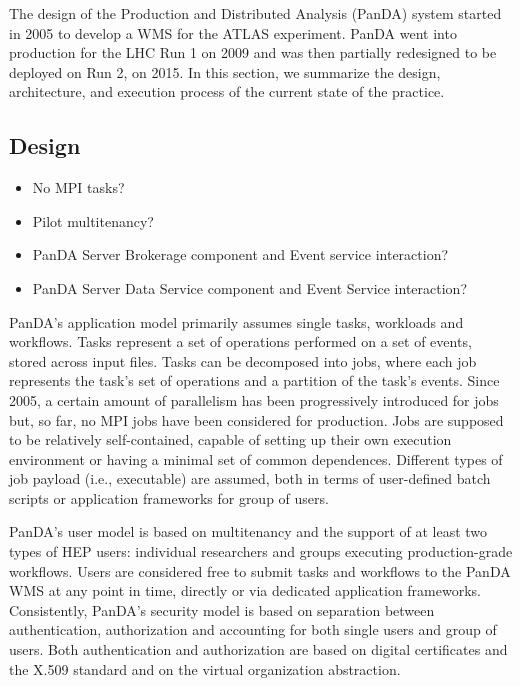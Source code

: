 
The design of the Production and Distributed Analysis (PanDA) system started in
2005 to develop a WMS for the ATLAS experiment. PanDA went into production for
the LHC Run 1 on 2009 and was then partially redesigned to be deployed on Run 2,
on 2015. In this section, we summarize the design, architecture, and execution
process of the current state of the practice.


\subsection{Design}
\label{ssec:panda_design}

\begin{itemize}
  \item No MPI tasks?
  \item Pilot multitenancy?
  \item PanDA Server Brokerage component and Event service interaction?
  \item PanDA Server Data Service component and Event Service interaction?
\end{itemize}

PanDA's application model primarily assumes single tasks, workloads and
workflows. Tasks represent a set of operations performed on a set of events,
stored across input files. Tasks can be decomposed into jobs, where each job
represents the task's set of operations and a partition of the task's events.
Since 2005, a certain amount of parallelism has been progressively introduced
for jobs~\cite{multithreaded_jobs} but, so far, no MPI jobs have been considered
for production. Jobs are supposed to be relatively self-contained, capable of
setting up their own execution environment or having a minimal set of common
dependences. Different types of job payload (i.e., executable) are assumed, both
in terms of user-defined batch scripts or application frameworks for group of
users.

PanDA's user model is based on multitenancy and the support of at least two
types of HEP users: individual researchers and groups executing production-grade
workflows. Users are considered free to submit tasks and workflows to the PanDA
WMS at any point in time, directly or via dedicated application frameworks.
Consistently, PanDA's security model is based on separation between
authentication, authorization and accounting for both single users and group of
users. Both authentication and authorization are based on digital certificates
and the X.509 standard and on the virtual organization abstraction.

